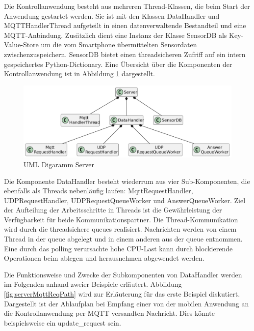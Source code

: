 \documentclass[11pt,a4paper]{report}
\begin{document}
Die Kontrollanwendung besteht aus mehreren Thread-Klassen, die beim Start der Anwendung gestartet werden.
Sie ist mit den Klassen DataHandler und MQTTHandlerThread aufgeteilt in einen datenverwaltende Bestandteil und eine MQTT-Anbindung.
Zusätzlich dient eine Instanz der Klasse SensorDB als Key-Value-Store um die vom Smartphone übermittelten Sensordaten zwischenzuspeichern.
SensorDB bietet einen threadsicheren Zufriff auf ein intern gespeichertes Python-Dictionary.
Eine Übersicht über die Komponenten der Kontrollanwendung ist in Abbildung \ref{fig:serverUml} dargestellt.
\begin{figure}[htbp]
  \centering
  \includegraphics[width=\textwidth]{images/ServerUml}
  \caption{UML Digaramm Server}
  \label{fig:serverUml}
\end{figure}
Die Komponente DataHandler besteht wiederrum aus vier Sub-Komponenten, die ebenfalls als Threads nebenläufig laufen: MqttRequestHandler, UDPRequestHandler, UDPRequestQueueWorker und AnswerQueueWorker.
Ziel der Aufteilung der Arbeitsschritte in Threads ist die Gewährleistung der Verfügbarkeit für beide Kommunikationspartner.
Die Thread-Kommunikation wird durch die threadsichere queues \cite{python_queue} realisiert.
Nachrichten werden von einem Thread in der queue abgelegt und in einem anderen aus der queue entnommen.
Eine durch das polling verursachte hohe CPU-Last kann durch blockierende Operationen beim ablegen und herausnehmen abgewendet werden.

Die Funktionsweise und Zwecke der Subkomponenten von DataHandler werden im Folgenden anhand zweier Beispiele erläutert.
Abbildung \ref{fig:serverMqttReqPath} wird zur Erläuterung für das erste Beispiel diskutiert.
Dargestellt ist der Ablaufplan bei Empfang einer von der mobilen Anwendung an die Kontrollanwendung per MQTT versandten Nachricht.
Dies könnte beispielsweise ein update\_request sein.
\end{document}
